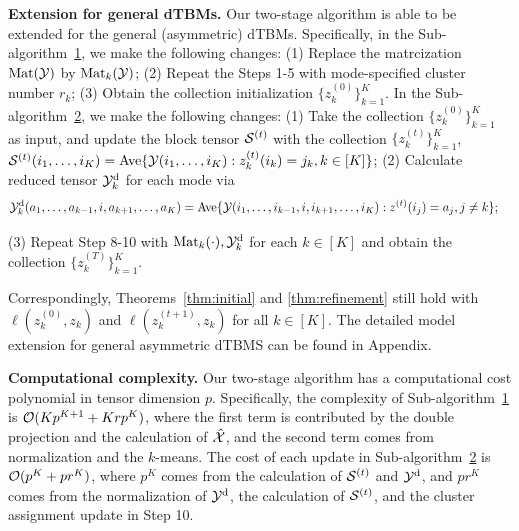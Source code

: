 \documentclass[lettersize,onecolumn,journal]{IEEEtran}
\theoremstyle{definition}
\theoremstyle{definition}
\begin{document}
{\bf Extension for general dTBMs.} Our two-stage algorithm is able to be extended for the general (asymmetric) dTBMs. Specifically, in the Sub-algorithm~\hyperref[alg:main]{1}, we make the following changes: (1)
Replace the matrcization $\text{Mat}(\mathcal{Y})$ by $\text{Mat}_k(\mathcal{Y})$; (2) Repeat the Steps 1-5 with mode-specified cluster number $r_k$; (3) Obtain the collection initialization $ \{z^{(0)}_k\}_{k=1}^K$. In the Sub-algorithm~\hyperref[alg:main]{2}, we make the following changes: (1) Take the collection $\{z^{(0)}_k\}_{k=1}^K$ as input, and update the block tensor $\mathcal{S}^{(t)}$ with the collection $\{ z_k^{(t)}\}_{k=1}^K$, $
        \mathcal{S}^{(t)}(i_1,\ldots, i_K) =  \text{Ave} \{\mathcal{Y}(i_1,\ldots,i_K): z^{(t)}_k(i_k) = j_k, k \in [K]\}$;
(2) Calculate reduced tensor $\mathcal{Y}^{\text{d}}_k$ for each mode via
\begin{align}
    &\mathcal{Y}^{\text{d}}_k(a_1,\ldots,a_{k-1}, i ,a_{k+1},\ldots,a_K) 
    = \text{Ave}\{\mathcal{Y}(i_1,\ldots,i_{k-1},i,i_{k+1},\ldots,i_K): z^{(t)}(i_j) = a_j, j \neq k \}; 
\end{align}

(3) Repeat Step 8-10 with $\text{Mat}_k(\cdot), \mathcal{Y}_k^{\text{d}}$ for each $k \in [K]$ and obtain the collection $\{z^{(T)}_k\}_{k=1}^K$. 

Correspondingly, Theorems~\ref{thm:initial} and \ref{thm:refinement} still hold with $\ell(z^{(0)}_k, z_k)$ and $\ell(z^{(t+1)}_k, z_k)$  for all $k \in [K]$. The detailed model extension for general asymmetric dTBMS can be found in Appendix. 

{\bf Computational complexity.} Our two-stage algorithm has a computational cost polynomial in tensor dimension $p$. Specifically, the complexity of Sub-algorithm~\hyperref[alg:main]{1} is $\mathcal{O}(K p^{K+1} + Krp^K)$, where the first term is contributed by the double projection and the calculation of $\hat {\mathcal{X}}$, and the second term comes from normalization and the $k$-means. The cost of each update in Sub-algorithm~\hyperref[alg:main]{2} is $\mathcal{O}(p^K + pr^K)$, where $p^K$ comes from the calculation of $\mathcal{S}^{(t)}$ and $\mathcal{Y}^{\text{d}}$, and $pr^K$ comes from the normalization of $\mathcal{Y}^{\text{d}}$, the calculation of $\mathcal{S}^{(t)}$, and the cluster assignment update in Step 10.
\end{document}
